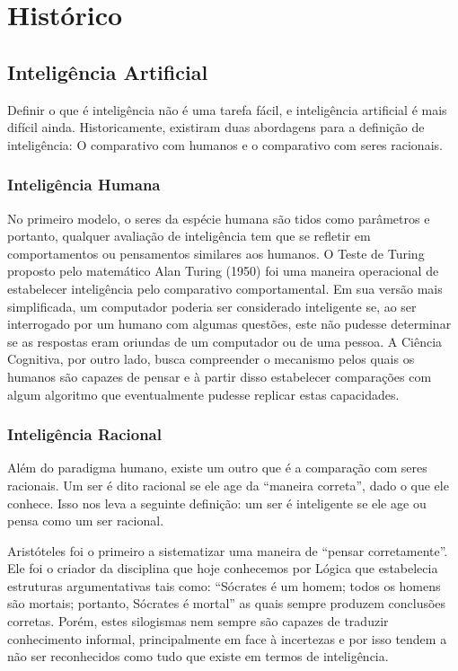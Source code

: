 
\chapter{Histórico}

\section{Inteligência Artificial}

Definir o que é inteligência não é uma tarefa fácil, e inteligência artificial
é mais difícil ainda. Historicamente, existiram duas abordagens para a
definição de inteligência: O comparativo com humanos e o comparativo com seres
racionais.

\subsection{Inteligência Humana}

No primeiro modelo, o seres da espécie humana são tidos como parâmetros e
portanto, qualquer avaliação de inteligência tem que se refletir em
comportamentos ou pensamentos similares aos humanos. O Teste de Turing proposto
pelo matemático Alan Turing (1950) foi uma maneira operacional de estabelecer
inteligência pelo comparativo comportamental. Em sua versão mais simplificada,
um computador poderia ser considerado inteligente se, ao ser interrogado por um
humano com algumas questões, este não pudesse determinar se as respostas eram
oriundas de um computador ou de uma pessoa. A Ciência Cognitiva, por outro
lado, busca compreender o mecanismo pelos quais os humanos são capazes de
pensar e à partir disso estabelecer comparações com algum algoritmo que
eventualmente pudesse replicar estas capacidades.

\subsection{Inteligência Racional}

Além do paradigma humano, existe um outro que é a comparação com seres
racionais. Um ser é dito racional se ele age da ``maneira correta'', dado o que
ele conhece. Isso nos leva a seguinte definição: um ser é inteligente se ele
age ou pensa como um ser racional.

Aristóteles foi o primeiro a sistematizar uma maneira de ``pensar
corretamente''.  Ele foi o criador da disciplina que hoje conhecemos por Lógica
que estabelecia estruturas argumentativas tais como: ``Sócrates é um homem;
todos os homens são mortais; portanto, Sócrates é mortal'' as quais sempre
produzem conclusões corretas. Porém, estes silogismas nem sempre são capazes de
traduzir conhecimento informal, principalmente em face à incertezas e por isso
tendem a não ser reconhecidos como tudo que existe em termos de inteligência.

